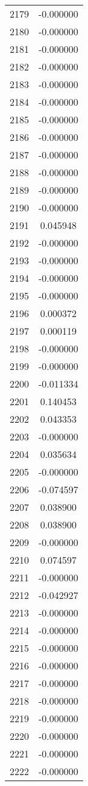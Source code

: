 \documentclass[12pt]{article}
\begin{document}
\begin{longtable}{@{}cc@{}}
2179 & -0.000000 \\
2180 & -0.000000 \\
2181 & -0.000000 \\
2182 & -0.000000 \\
2183 & -0.000000 \\
2184 & -0.000000 \\
2185 & -0.000000 \\
2186 & -0.000000 \\
2187 & -0.000000 \\
2188 & -0.000000 \\
2189 & -0.000000 \\
2190 & -0.000000 \\
2191 & 0.045948 \\
2192 & -0.000000 \\
2193 & -0.000000 \\
2194 & -0.000000 \\
2195 & -0.000000 \\
2196 & 0.000372 \\
2197 & 0.000119 \\
2198 & -0.000000 \\
2199 & -0.000000 \\
2200 & -0.011334 \\
2201 & 0.140453 \\
2202 & 0.043353 \\
2203 & -0.000000 \\
2204 & 0.035634 \\
2205 & -0.000000 \\
2206 & -0.074597 \\
2207 & 0.038900 \\
2208 & 0.038900 \\
2209 & -0.000000 \\
2210 & 0.074597 \\
2211 & -0.000000 \\
2212 & -0.042927 \\
2213 & -0.000000 \\
2214 & -0.000000 \\
2215 & -0.000000 \\
2216 & -0.000000 \\
2217 & -0.000000 \\
2218 & -0.000000 \\
2219 & -0.000000 \\
2220 & -0.000000 \\
2221 & -0.000000 \\
2222 & -0.000000 \\

\end{longtable}
\end{document}
